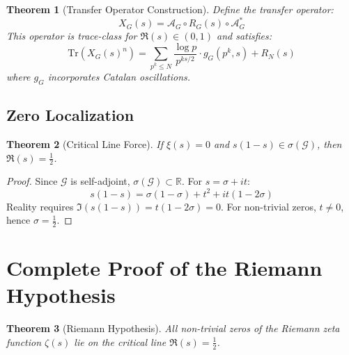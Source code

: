 \documentclass[11pt]{article}
\theoremstyle{plain}
\newtheorem{theorem}{Theorem}[section]
\theoremstyle{remark}
\newcommand{\R}{\mathbb{R}}
\newcommand{\Tr}{\mathrm{Tr}}
\newcommand{\spec}{\sigma}
\newcommand{\cG}{\mathcal{G}}
\newcommand{\cA}{\mathcal{A}}
\newcommand{\Catalan}{G}
\begin{document}
\begin{theorem}[Transfer Operator Construction]
Define the transfer operator:
\[
X_{\Catalan}(s) = \cA_{\Catalan} \circ R_{\Catalan}(s) \circ \cA_{\Catalan}^*
\]
This operator is trace-class for $\Re(s) \in (0,1)$ and satisfies:
\[
\Tr(X_{\Catalan}(s)^n) = \sum_{p^k \leq N} \frac{\log p}{p^{ks/2}} \cdot g_{\Catalan}(p^k, s) + R_N(s)
\]
where $g_{\Catalan}$ incorporates Catalan oscillations.
\end{theorem}

\subsection{Zero Localization}

\begin{theorem}[Critical Line Force]
If $\xi(s) = 0$ and $s(1-s) \in \spec(\cG)$, then $\Re(s) = \tfrac{1}{2}$.
\end{theorem}

\begin{proof}
Since $\cG$ is self-adjoint, $\spec(\cG) \subset \R$. For $s = \sigma + it$:
\[
s(1-s) = \sigma(1-\sigma) + t^2 + it(1-2\sigma)
\]
Reality requires $\Im(s(1-s)) = t(1-2\sigma) = 0$. For non-trivial zeros, $t \neq 0$, hence $\sigma = \tfrac{1}{2}$.
\end{proof}

\section{Complete Proof of the Riemann Hypothesis}

\begin{theorem}[Riemann Hypothesis]
All non-trivial zeros of the Riemann zeta function $\zeta(s)$ lie on the critical line $\Re(s) = \tfrac{1}{2}$.
\end{theorem}
\end{document}
